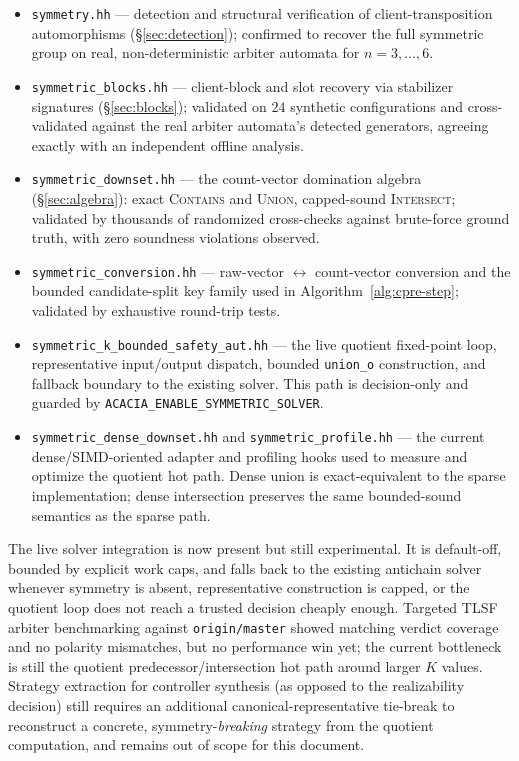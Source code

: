 \documentclass[11pt]{article}
\begin{document}
\begin{itemize}[nosep]
  \item \texttt{symmetry.hh} --- detection and structural verification of
    client-transposition automorphisms (\S\ref{sec:detection}); confirmed
    to recover the full symmetric group on real, non-deterministic arbiter
    automata for $n=3,\dots,6$.
  \item \texttt{symmetric\_blocks.hh} --- client-block and slot recovery
    via stabilizer signatures (\S\ref{sec:blocks}); validated on $24$
    synthetic configurations and cross-validated against the real arbiter
    automata's detected generators, agreeing exactly with an independent
    offline analysis.
  \item \texttt{symmetric\_downset.hh} --- the count-vector domination
    algebra (\S\ref{sec:algebra}): exact \textsc{Contains} and
    \textsc{Union}, capped-sound \textsc{Intersect}; validated by
    thousands of randomized cross-checks against brute-force ground
    truth, with zero soundness violations observed.
  \item \texttt{symmetric\_conversion.hh} --- raw-vector $\leftrightarrow$
    count-vector conversion and the bounded candidate-split key family
    used in Algorithm~\ref{alg:cpre-step}; validated by exhaustive
    round-trip tests.
  \item \texttt{symmetric\_k\_bounded\_safety\_aut.hh} --- the live
    quotient fixed-point loop, representative input/output dispatch, bounded
    \texttt{union\_o} construction, and fallback boundary to the existing
    solver. This path is decision-only and guarded by
    \texttt{ACACIA\_ENABLE\_SYMMETRIC\_SOLVER}.
  \item \texttt{symmetric\_dense\_downset.hh} and
    \texttt{symmetric\_profile.hh} --- the current dense/SIMD-oriented
    adapter and profiling hooks used to measure and optimize the quotient
    hot path. Dense union is exact-equivalent to the sparse implementation;
    dense intersection preserves the same bounded-sound semantics as the
    sparse path.
\end{itemize}

\noindent The live solver integration is now present but still
experimental. It is default-off, bounded by explicit work caps, and falls
back to the existing antichain solver whenever symmetry is absent,
representative construction is capped, or the quotient loop does not reach a
trusted decision cheaply enough. Targeted TLSF arbiter benchmarking against
\texttt{origin/master} showed matching verdict coverage and no polarity
mismatches, but no performance win yet; the current bottleneck is still the
quotient predecessor/intersection hot path around larger $K$ values.
Strategy extraction for controller synthesis (as opposed to the
realizability decision) still requires an additional
canonical-representative tie-break to reconstruct a concrete,
symmetry-\emph{breaking} strategy from the quotient computation, and remains
out of scope for this document.
\end{document}
